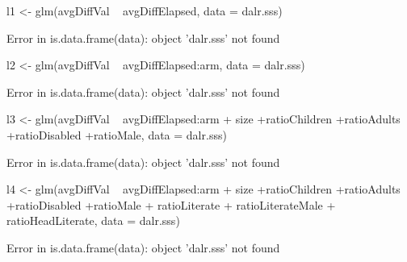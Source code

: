 \begin{Schunk}
\begin{Sinput}
l1 <- glm(avgDiffVal ~ avgDiffElapsed, data = dalr.sss)
\end{Sinput}
\begin{Soutput}
Error in is.data.frame(data): object 'dalr.sss' not found
\end{Soutput}
\begin{Sinput}
l2 <- glm(avgDiffVal ~ avgDiffElapsed:arm, data = dalr.sss)
\end{Sinput}
\begin{Soutput}
Error in is.data.frame(data): object 'dalr.sss' not found
\end{Soutput}
\begin{Sinput}
l3 <- glm(avgDiffVal ~ avgDiffElapsed:arm + 
	size +ratioChildren +ratioAdults +ratioDisabled +ratioMale, data = dalr.sss)
\end{Sinput}
\begin{Soutput}
Error in is.data.frame(data): object 'dalr.sss' not found
\end{Soutput}
\begin{Sinput}
l4 <- glm(avgDiffVal ~ avgDiffElapsed:arm + 
	size +ratioChildren +ratioAdults +ratioDisabled +ratioMale +
	ratioLiterate + ratioLiterateMale + ratioHeadLiterate, data = dalr.sss)
\end{Sinput}
\begin{Soutput}
Error in is.data.frame(data): object 'dalr.sss' not found
\end{Soutput}
\end{Schunk}

